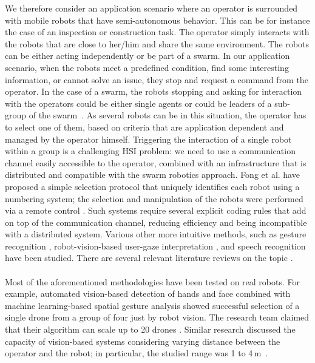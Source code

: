 \documentclass[smallextended]{svjour3}
\begin{document}
We therefore consider an application scenario where an operator is surrounded with mobile robots that have semi-autonomous behavior. This can be for instance the case of an inspection or construction task. 
The operator simply interacts with the robots that are close to her/him and share the same environment. The robots can be either acting independently or be part of a swarm. 
In our application scenario, when the robots meet a predefined condition, find some interesting information, or cannot solve an issue, they stop and request a command from the operator. In the case of a swarm, the robots stopping and asking for interaction with the operators could be either single agents or could be leaders of a sub-group of the swarm~\cite{Goodrich2012}. As several robots can be in this situation, the operator has to select one of them, based on criteria that are application dependent and managed by the operator himself. Triggering the interaction of a single robot within a group is a challenging HSI problem: we need to use a communication channel easily accessible to the operator, combined with an infrastructure that is distributed and compatible with the swarm robotics approach.
Fong et al. have proposed a simple selection protocol that uniquely identifies each robot using a numbering system; the selection and manipulation of the robots were performed via a remote control \cite{fong2003}. 
Such systems require several explicit coding rules that add on top of the communication channel, reducing efficiency and being incompatible with a distributed system. 
Various other more intuitive methods, such as gesture recognition \cite{Couture-Beil2010,Jones2010,Monajjemi2013,Nagietal2014}, robot-vision-based user-gaze interpretation \cite{Couture-Beil2010,Monajjemi2013,Pourmehr2013}, and speech recognition \cite{Pourmehr2013} have been studied. 
There are several relevant literature reviews on the topic \cite{goodrich2007human,Kolling2016,yanco2004classifying}.\\
\\
Most of the aforementioned methodologies have been tested on real robots. 
For example, automated vision-based detection of hands and face combined with machine learning-based spatial gesture analysis showed successful selection of a single drone from a group of four just by robot vision. 
The research team claimed that their algorithm can scale up to 20 drones \cite{Nagietal2014}. Similar research discussed the capacity of vision-based systems considering varying distance between the operator and the robot; in particular, the studied range was 1 to 4\,m~\cite{Couture-Beil2010}. 
\end{document}
